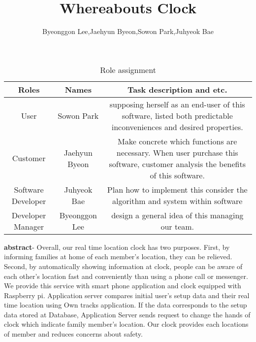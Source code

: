 \documentclass[10pt,a4paper,twocolumn]{report}
\begin{document}
\title{Whereabouts Clock}
\author{Byeonggon Lee,Jaehyun Byeon,Sowon Park,Juhyeok Bae}
\maketitle


\begin{table}[]
\centering
\caption{Role assignment}
\begin{tabular}{ccc}
	\multicolumn{1}{c|}{Roles} & \multicolumn{1}{c|}{Names} & Task description and etc. \\ \hline
	\multicolumn{1}{c|}{User} & \multicolumn{1}{c|}{Sowon Park} &  supposing herself as an 
	end-user of this software, listed both predictable inconveniences and desired properties.\\ \hline
	\multicolumn{1}{c|}{Customer} & \multicolumn{1}{c|}{Jaehyun Byeon} & Make concrete which functions are necessary. When 
	user purchase this software, customer analysis the benefits of this software.  \\ \hline
	\multicolumn{1}{c|}{Software Developer} & \multicolumn{1}{c|}{Juhyeok Bae} & Plan how to implement this %
	consider the algorithm and system within software \\ \hline
	\multicolumn{1}{c|}{Developer Manager} & \multicolumn{1}{c|}{Byeonggon Lee} & design a general idea of this %
	managing our team. \\ \hline
\end{tabular}
\end{table} 


\textbf{abstract}- Overall, our real time location clock has two purposes. First, by informing families at home of each member’s location, they can be relieved. Second, by automatically showing information at clock, people can be aware of each other's location fast and conveniently than using a phone call or messenger. We provide this service with smart phone application and clock equipped with Raspberry pi. Application server compares initial user's setup data and their real time location using Own tracks application. If the data corresponds to the setup data stored at Database, Application Server sends request to change the hands of clock which indicate family member’s location. Our clock provides each locations of member and reduces concerns about safety.
\end{document}
